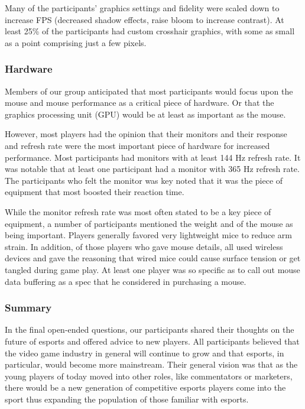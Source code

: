 \documentclass[sigconf]{acmart}
\begin{document}
Many of the participants' graphics settings and fidelity were scaled down to increase FPS (decreased shadow effects, raise bloom to increase contrast). At least 25\% of the participants had custom crosshair graphics, with some as small as a point comprising just a few pixels.

\subsubsection{Hardware}

Members of our group anticipated that most participants would focus upon the mouse and mouse performance as a critical piece of hardware. Or that the graphics processing unit (GPU) would be at least as important as the mouse. 

However, most players had the opinion that their monitors and their response and refresh rate were the most important piece of hardware for increased performance. Most participants had monitors with at least 144 Hz refresh rate. It was notable that at least one participant had a monitor with 365 Hz refresh rate. The participants who felt the monitor was key noted that it was the piece of equipment that most boosted their reaction time.

While the monitor refresh rate was most often stated to be a key piece of equipment, a number of participants mentioned the weight and of the mouse as being important. Players generally favored very lightweight mice to reduce arm strain. In addition, of those players who gave mouse details, all used wireless devices and gave the reasoning that wired mice could cause surface tension or get tangled during game play. At least one player was so specific as to call out mouse data buffering as a spec that he considered in purchasing a mouse.

\subsubsection{Summary}

In the final open-ended questions, our participants shared their thoughts on the future of esports and offered advice to new players. All participants believed that the video game industry in general will continue to grow and that esports, in particular, would become more mainstream. Their general vision was that as the young players of today moved into other roles, like commentators or marketers, there would be a new generation of competitive esports players come into the sport thus expanding the population of those familiar with esports. 
\end{document}
